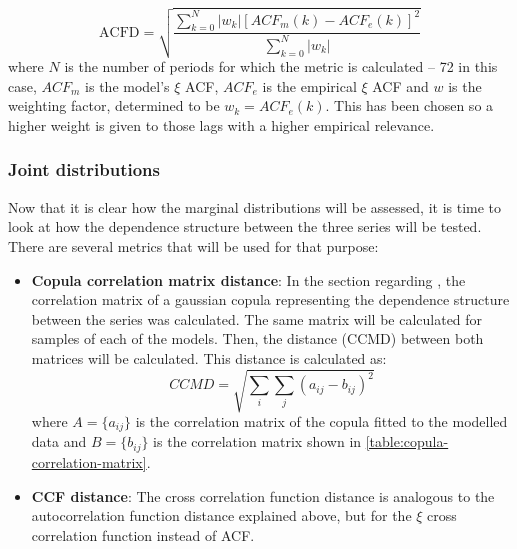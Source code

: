 \begin{itemize}
    \begin{equation}
        \text{ACFD}=\sqrt{\frac{\sum_{k=0}^N |w_k|\left[ACF_m\left(k\right)-ACF_e\left(k\right)\right]^2}{\sum_{k=0}^N |w_k|}}
    \end{equation}
    where $N$ is the number of periods for which the metric is calculated -- 72 in this case, $ACF_m$ is the model's $\xi$ ACF, $ACF_e$ is the empirical $\xi$ ACF and $w$ is the weighting factor, determined to be $w_k=ACF_e\left(k\right)$. This has been chosen so a higher weight is given to those lags with a higher empirical relevance. 
\end{itemize}
\subsubsection{Joint distributions}
Now that it is clear how the marginal distributions will be assessed, it is time to look at how the dependence structure between the three series will be tested. There are several metrics that will be used for that purpose:
\begin{itemize}
    \item \textbf{Copula correlation matrix distance}: In the section regarding , the correlation matrix of a gaussian copula representing the dependence structure between the series was calculated. The same matrix will be calculated for samples of each of the models. Then, the distance (CCMD) between both matrices will be calculated. This distance is calculated as:
    \begin{equation}
        CCMD=\sqrt{\sum_i\sum_j\left(a_{ij}-b_{ij}\right)^2}
    \end{equation}
    where $A=\{a_{ij}\}$ is the correlation matrix of the copula fitted to the modelled data and $B=\{b_{ij}\}$ is the correlation matrix shown in \autoref{table:copula-correlation-matrix}.
    \item \textbf{CCF distance}: The cross correlation function distance is analogous to the autocorrelation function distance explained above, but for the $\xi$ cross correlation function instead of ACF.
\end{itemize}

